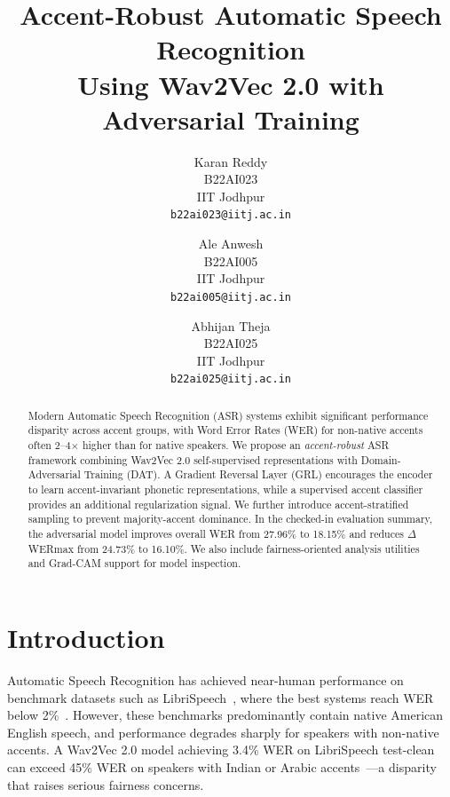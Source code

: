 \documentclass[10pt,twocolumn,letterpaper]{article}
\begin{document}
\title{Accent-Robust Automatic Speech Recognition\\
       Using Wav2Vec 2.0 with Adversarial Training}

\author{
Karan Reddy\\
B22AI023\\
IIT Jodhpur\\
{\tt\small b22ai023@iitj.ac.in}
\and
Ale Anwesh\\
B22AI005\\
IIT Jodhpur\\
{\tt\small b22ai005@iitj.ac.in}
\and
Abhijan Theja\\
B22AI025\\
IIT Jodhpur\\
{\tt\small b22ai025@iitj.ac.in}
}

\maketitle

\begin{abstract}
Modern Automatic Speech Recognition (ASR) systems exhibit significant performance disparity across accent groups, with Word Error Rates (WER) for non-native accents often 2--4$\times$ higher than for native speakers. We propose an \textit{accent-robust} ASR framework combining Wav2Vec 2.0 self-supervised representations with Domain-Adversarial Training (DAT). A Gradient Reversal Layer (GRL) encourages the encoder to learn accent-invariant phonetic representations, while a supervised accent classifier provides an additional regularization signal. We further introduce accent-stratified sampling to prevent majority-accent dominance. In the checked-in evaluation summary, the adversarial model improves overall WER from 27.96\% to 18.15\% and reduces $\Delta$WERmax from 24.73\% to 16.10\%. We also include fairness-oriented analysis utilities and Grad-CAM support for model inspection.
\end{abstract}

\section{Introduction}

Automatic Speech Recognition has achieved near-human performance on benchmark datasets such as LibriSpeech~\cite{panayotov2015librispeech}, where the best systems reach WER below 2\%~\cite{baevski2020wav2vec2}. However, these benchmarks predominantly contain native American English speech, and performance degrades sharply for speakers with non-native accents. A Wav2Vec 2.0 model achieving 3.4\% WER on LibriSpeech test-clean can exceed 45\% WER on speakers with Indian or Arabic accents~\cite{shi2021accented}—a disparity that raises serious fairness concerns.
\end{document}
